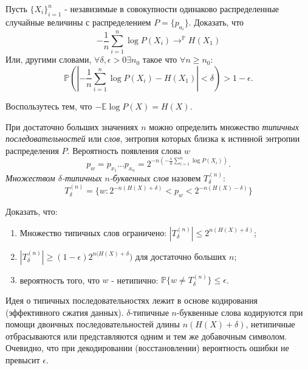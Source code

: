 \begin{problem}
Пусть $\{X_i\}_{i=1}^n$ - незавизимые в совокупности одинаково распределенные случайные величины с распределением $P = \{p_{a_i}\}$. Доказать, что 
\begin{equation}
-\frac{1}{n} \sum_{i = 1}^n \log P(X_i) \rightarrow^{\mathbb{P}} H(X_1)
\end{equation}
Или, другими словами, $\forall \delta, \epsilon > 0 \exists n_0$ такое что $\forall n \geq n_0$:
\begin{equation}
\mathbb{P}(|-\frac{1}{n} \sum_{i = 1}^n \log P(X_i) - H(X_1)| < \delta) > 1-\epsilon.
\end{equation}

\begin{ordre}
Воспользутесь тем, что $-\mathbb{E} \log P(X) = H(X)$.
\end{ordre}
\end{problem}

\begin{remark} При достаточно больших значениях $n$ можно определить множество \textit{типичных последовательностей} или \textit{слов}, энтропия которых близка к истинной энтропии распределения $P$. Вероятность появления слова $w$
\begin{equation}
p_w = p_{x_1}...p_{x_n} = 2^{-n (-\frac{1}{n} \sum_{i = 1}^n \log P(X_i))}.
\end{equation}
\textit{Множеством $\delta$-типичных $n$-буквенных слов} назовем $T_{\delta}^{(n)}$:
\begin{equation}
T_{\delta}^{(n)} = \{w: 2^{-n(H(X) + \delta)} < p_w < 2^{-n(H(X) - \delta)} \}
\end{equation}
\end{remark}

\begin{problem}
Доказать, что:
\begin{enumerate}
\item Множество типичных слов ограничено: $|T_{\delta}^{(n)}| \leq 2^{n(H(X) + \delta)}$;
\item $|T_{\delta}^{(n)}| \geq (1-\epsilon)2^{n(H(X) + \delta})$ для достаточно больших $n$;
\item вероятность того, что $w$ - нетипично: $\mathbb{P}\{w \neq T_{\delta}^{(n)} \} \leq \epsilon$.
\end{enumerate}
\end{problem}

\begin{remark} Идея о типичных последовательностях лежит в основе кодирования (эффективного сжатия данных). $\delta$-типичные $n$-буквенные слова кодируются при помощи двоичных последовательностей длины $n(H(X) + \delta)$, нетипичные отбрасываются или представляются одним и тем же добавочным символом. Очевидно, что при декодировании (восстановлении) вероятность ошибки не превысит $\epsilon$.
\end{remark}

